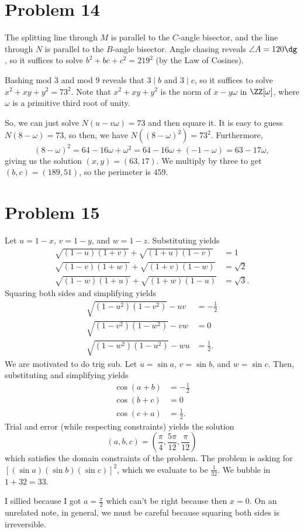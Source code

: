 \documentclass{scrartcl}
\begin{document}
\section*{Problem 14}
The splitting line through $M$ is parallel to the $C$-angle bisector,
and the line through $N$ is parallel to the $B$-angle bisector.
Angle chasing reveals $\angle A = 120\dg$, so
it suffices to solve $b^2 + bc + c^2 = 219^2$ (by the Law of Cosines).

Bashing mod 3 and mod 9 reveals that $3 \mid b$ and $3 \mid c$,
so it suffices to solve $x^2 + xy + y^2 = 73^2$.
Note that $x^2 + xy + y^2$ is the norm of $x - y\omega$ in $\ZZ[\omega]$,
where $\omega$ is a primitive third root of unity.

So, we can just solve $N(u-v\omega) = 73$ and then square it.
It is easy to guess $N(8-\omega) = 73$,
so then, we have $N((8-\omega)^2) = 73^2$.
Furthermore,
\[ (8 - \omega)^2 = 64 - 16\omega + \omega^2 = 64 - 16\omega + (-1 - \omega) = 63 - 17\omega, \]
giving us the solution $(x,y) = (63,17)$.
We multiply by three to get $(b,c) = (189, 51)$, so the perimeter is $\boxed{459}$.

\section*{Problem 15}
Let $u = 1-x$, $v = 1-y$, and $w = 1-z$.
Substituting yields
\begin{align*}
\sqrt{(1-u)(1+v)} + \sqrt{(1+u)(1-v)} &= 1 \\
\sqrt{(1-v)(1+w)} + \sqrt{(1+v)(1-w)} &= \sqrt 2 \\
\sqrt{(1-w)(1+u)} + \sqrt{(1+w)(1-u)} &= \sqrt 3.
\end{align*}
Squaring both sides and simplifying yields
\begin{align*}
    \sqrt{(1-u^2)(1-v^2)} - uv &= -\frac12 \\
    \sqrt{(1-v^2)(1-w^2)} - vw &= 0 \\
    \sqrt{(1-w^2)(1-u^2)} - wu &= \frac12.
\end{align*}
We are motivated to do trig sub.
Let $u = \sin a$, $v = \sin b$, and $w = \sin c$.
Then, substituting and simplifying yields
\begin{align*}
\cos(a+b) &= -\frac12 \\
\cos(b+c) &= 0 \\
\cos(c+a) &= \frac12.
\end{align*}
Trial and error (while respecting constraints) yields the solution
\[ (a,b,c) = \left(\frac{\pi}{4}, \frac{5\pi}{12}, \frac{\pi}{12}\right) \]
which satisfies the domain constraints of the problem.
The problem is asking for $[(\sin a)(\sin b)(\sin c)]^2$,
which we evaluate to be $\frac{1}{32}$.
We bubble in $1 + 32 = \boxed{33}$.

\begin{remark*}
I sillied because I got $a = \frac{\pi}{2}$ which can't be right because then $x = 0$.
On an unrelated note, in general, we must be careful because squaring both sides is irreversible.
\end{remark*}
\end{document}
